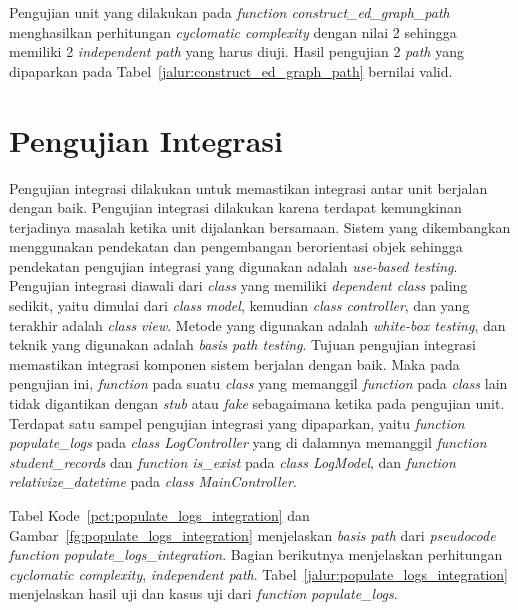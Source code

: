 Pengujian unit yang dilakukan pada \emph{function construct\_ed\_graph\_path}
menghasilkan perhitungan \emph{cyclomatic complexity} dengan nilai 2 sehingga
memiliki 2 \emph{independent path} yang harus diuji. Hasil pengujian 2
\emph{path} yang dipaparkan pada Tabel~\ref{jalur:construct_ed_graph_path}
bernilai valid.


\section{Pengujian Integrasi}

Pengujian integrasi dilakukan untuk memastikan integrasi antar unit berjalan
dengan baik. Pengujian integrasi dilakukan karena terdapat kemungkinan
terjadinya masalah ketika unit dijalankan bersamaan. Sistem yang dikembangkan
menggunakan pendekatan dan pengembangan berorientasi objek sehingga pendekatan
pengujian integrasi yang digunakan adalah \emph{use-based testing}. Pengujian
integrasi diawali dari \emph{class} yang memiliki \emph{dependent class} paling
sedikit, yaitu dimulai dari \emph{class} \emph{model}, kemudian \emph{class
  controller}, dan yang terakhir adalah \emph{class} \emph{view}. Metode yang
digunakan adalah \emph{white-box testing}, dan teknik yang digunakan adalah
\emph{basis path testing}. Tujuan pengujian integrasi memastikan integrasi
komponen sistem berjalan dengan baik. Maka pada pengujian ini, \emph{function}
pada suatu \emph{class} yang memanggil \emph{function} pada \emph{class} lain
tidak digantikan dengan \emph{stub} atau \emph{fake} sebagaimana ketika pada
pengujian unit. Terdapat satu sampel pengujian integrasi yang dipaparkan, yaitu
\emph{function populate\_logs} pada \emph{class LogController} yang di dalamnya
memanggil \emph{function student\_records} dan \emph{function is\_exist} pada
\emph{class LogModel}, dan \emph{function relativize\_datetime} pada \emph{class
  MainController}.

Tabel Kode~\ref{pct:populate_logs_integration} dan
Gambar~\ref{fg:populate_logs_integration} menjelaskan \emph{basis path}
dari \emph{pseudocode} \emph{function} \emph{populate\_logs\_integration}. Bagian
berikutnya menjelaskan perhitungan \emph{cyclomatic complexity},
\emph{independent path}.  Tabel~\ref{jalur:populate_logs_integration} menjelaskan
hasil uji dan kasus uji dari \emph{function} \emph{populate\_logs}.

